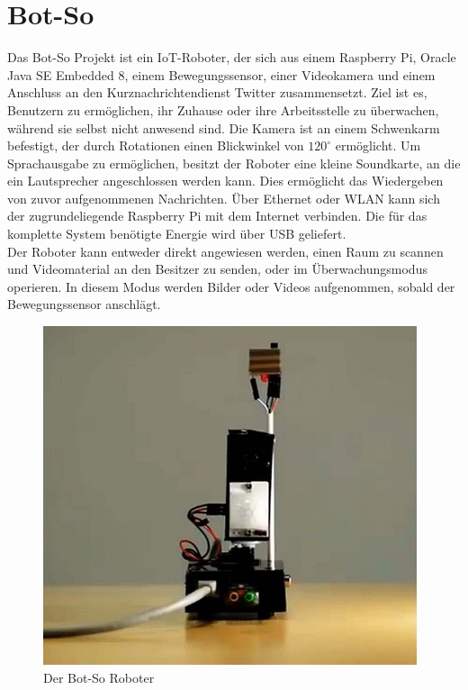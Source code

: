 \section{Bot-So}\label{s:Bot-So}

Das Bot-So Projekt ist ein \ac{IoT}-Roboter, der sich aus einem Raspberry Pi, Oracle Java SE Embedded 8, einem Bewegungssensor, einer Videokamera und einem Anschluss an den Kurznachrichtendienst Twitter zusammensetzt. Ziel ist es, Benutzern zu ermöglichen, ihr Zuhause oder ihre Arbeitsstelle zu überwachen, während sie selbst nicht anwesend sind. Die Kamera ist an einem Schwenkarm befestigt, der durch Rotationen einen Blickwinkel von $120^\circ$ ermöglicht. Um Sprachausgabe zu ermöglichen, besitzt der Roboter eine kleine Soundkarte, an die ein Lautsprecher angeschlossen werden kann. Dies ermöglicht das Wiedergeben von zuvor aufgenommenen Nachrichten\cite{ws:botsovoice}. Über Ethernet oder WLAN kann sich der zugrundeliegende Raspberry Pi mit dem Internet verbinden. Die für das komplette System benötigte Energie wird über USB geliefert.\\
Der Roboter kann entweder direkt angewiesen werden, einen Raum zu scannen und Videomaterial an den Besitzer zu senden, oder im Überwachungsmodus operieren. In diesem Modus  werden Bilder oder Videos aufgenommen, sobald der Bewegungssensor anschlägt\cite{z:botso}.\\

\begin{figure}[H] 
	\centering
	\includegraphics[scale=1.3]{Bilder/botso}
	\caption{Der Bot-So Roboter\cite{i:botso}}
	\label{f:botso}
\end{figure}

